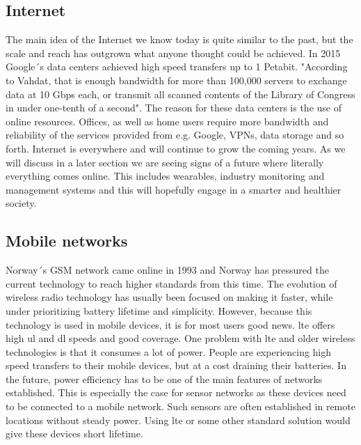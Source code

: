 \documentclass[USenglish]{ifimaster}  %
\begin{document}
\subsection{Internet}
The main idea of the Internet we know today is quite similar to the past, but the scale and reach has outgrown what anyone thought could be achieved. In 2015 Google´s data centers achieved high speed transfers up to 1 Petabit. "According to Vahdat, that is enough bandwidth for more than 100,000 servers to exchange data at 10 Gbps each, or transmit all scanned contents of the Library of Congress in under one-tenth of a second"\cite{online:petabitGoogle}. The reason for these data centers is the use of online resources. Offices, as well as home users require more bandwidth and reliability of the services provided from e.g. Google, VPNs, data storage and so forth.
Internet is everywhere and will continue to grow the coming years. As we will discuss in a later section we are seeing signs of a future where literally everything comes online. This includes wearables, industry monitoring and management systems and this will hopefully engage in a smarter and healthier society.

\subsection{Mobile networks}
Norway´s GSM network came online in 1993 \cite{online:gsmTelenorNetcom} and Norway has pressured the current technology to reach higher standards from this time. The evolution of wireless radio technology has usually been focused on making it faster, while under prioritizing battery lifetime and simplicity. However, because this technology is used in mobile devices, it is for most users good news. \acrshort{lte} offers high \acrfull{ul} and \acrfull{dl} speeds and good coverage. One problem with \acrshort{lte} and older wireless technologies is that it consumes a lot of power. People are experiencing high speed transfers to their mobile devices, but at a cost draining their batteries. In the future, power efficiency has to be one of the main features of networks established. This is especially the case for sensor networks as these devices need to be connected to a mobile network. Such sensors are often established in remote locations without steady power. Using \acrshort{lte} or some other standard solution would give these devices short lifetime.
\end{document}
